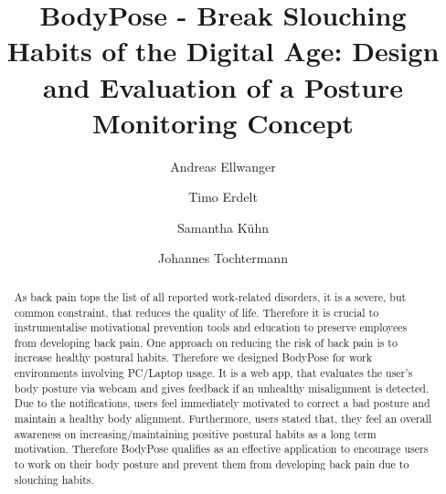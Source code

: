 \documentclass[sigconf]{acmart}
\begin{document}
\title[BodyPose - Break Slouching Habits of the Digital Age]{BodyPose - Break Slouching Habits of the Digital Age: Design and Evaluation of a Posture Monitoring Concept}

\author{Andreas Ellwanger}
\author{Timo Erdelt}
\author{Samantha Kühn}
\author{Johannes Tochtermann}

\begin{abstract}
As back pain tops the list of all reported work-related disorders, it is a severe, but common constraint, that reduces the quality of life. 
Therefore it is crucial to instrumentalise motivational prevention tools and education to preserve employees from developing back pain.
One approach on reducing the risk of back pain is to increase healthy postural habits. Therefore we designed BodyPose for work environments involving PC/Laptop usage. It is a web app, that evaluates the user's body posture via webcam and gives feedback if an unhealthy misalignment is detected.
Due to the notifications, users feel immediately motivated to correct a bad posture and maintain a healthy body alignment. Furthermore, users stated that, they feel an overall awareness on increasing/maintaining positive postural habits as a long term motivation.
Therefore BodyPose qualifies as an effective application to encourage users to work on their body posture and prevent them from developing back pain due to slouching habits.
\end{abstract}


\maketitle





\end{document}
